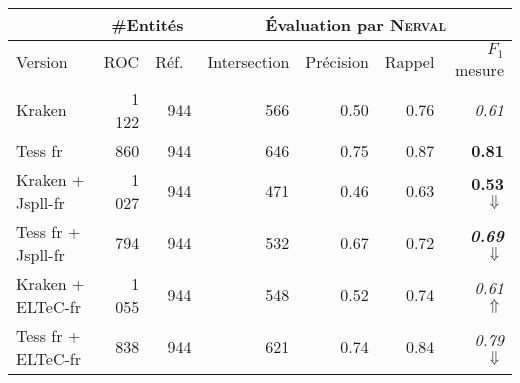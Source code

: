 \footnotesize{
\begin{tabular}{|l|r|r|r|r|r|r|}
\hline
 & \multicolumn{2}{c|}{{\#Entités}} & \multicolumn{4}{c|}{\'Evaluation par \textsc{Nerval}}\\
 \hline
Version & ROC & Réf.\ &Intersection& Précision & Rappel & $F_1$ mesure\\

 \hline
Kraken  & 1 122 & 944 &  566  & 0.50    &0.76  &\textit{0.61}  \\
\hline
Tess fr  & 860 &944  &646     & 0.75     & 0.87  & \textbf{0.81}  \\
\hline
\hline
Kraken + Jspll-fr & 1 027  &944  &471     & 0.46     & 0.63  &\textbf{ 0.53} $\Downarrow$  \\
\hline
Tess fr + Jspll-fr & 794&  944& 532     & 0.67 & 0.72 & \textit{\textbf{0.69}} $\Downarrow$  \\
\hline
\hline
Kraken + ELTeC-fr &1 055 & 944 &548 & 0.52     &0.74  & \textit{0.61} $\Uparrow$ \\
\hline
Tess fr + ELTeC-fr &838 & 944 & 621  & 0.74     &0.84  & \textit{0.79} $\Downarrow$ \\
\hline
\end{tabular}}